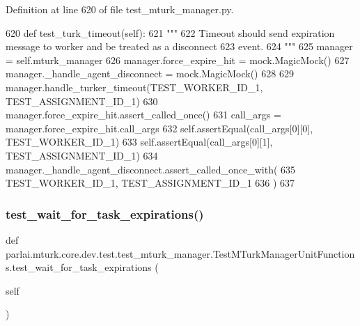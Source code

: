 Definition at line 620 of file test\+\_\+mturk\+\_\+manager.\+py.


\begin{DoxyCode}
620     \textcolor{keyword}{def }test\_turk\_timeout(self):
621         \textcolor{stringliteral}{"""}
622 \textcolor{stringliteral}{        Timeout should send expiration message to worker and be treated as a disconnect}
623 \textcolor{stringliteral}{        event.}
624 \textcolor{stringliteral}{        """}
625         manager = self.mturk\_manager
626         manager.force\_expire\_hit = mock.MagicMock()
627         manager.\_handle\_agent\_disconnect = mock.MagicMock()
628 
629         manager.handle\_turker\_timeout(TEST\_WORKER\_ID\_1, TEST\_ASSIGNMENT\_ID\_1)
630         manager.force\_expire\_hit.assert\_called\_once()
631         call\_args = manager.force\_expire\_hit.call\_args
632         self.assertEqual(call\_args[0][0], TEST\_WORKER\_ID\_1)
633         self.assertEqual(call\_args[0][1], TEST\_ASSIGNMENT\_ID\_1)
634         manager.\_handle\_agent\_disconnect.assert\_called\_once\_with(
635             TEST\_WORKER\_ID\_1, TEST\_ASSIGNMENT\_ID\_1
636         )
637 
\end{DoxyCode}
\mbox{\label{classparlai_1_1mturk_1_1core_1_1dev_1_1test_1_1test__mturk__manager_1_1TestMTurkManagerUnitFunctions_a6fe5e5af6b831868b8570f8015efafea}} 
\subsubsection{\texorpdfstring{test\+\_\+wait\+\_\+for\+\_\+task\+\_\+expirations()}{test\_wait\_for\_task\_expirations()}}
{\footnotesize\ttfamily def parlai.\+mturk.\+core.\+dev.\+test.\+test\+\_\+mturk\+\_\+manager.\+Test\+M\+Turk\+Manager\+Unit\+Functions.\+test\+\_\+wait\+\_\+for\+\_\+task\+\_\+expirations (\begin{DoxyParamCaption}\item[{}]{self }\end{DoxyParamCaption})}

